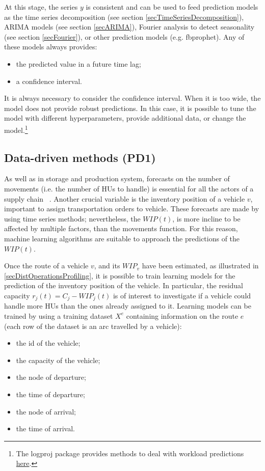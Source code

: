 At this stage, the series $y$ is consistent and can be used to feed prediction models as the time series decomposition (see section \ref{secTimeSeriesDecomposition}), ARIMA models (see section \ref{secARIMA}), Fourier analysis to detect seasonality (see section \ref{secFourier}), or other prediction models (e.g. fbprophet). Any of these models always provides:
\begin{itemize}
    \item the predicted value in a future time lag;
    \item a confidence interval.

\end{itemize}

It is always necessary to consider the confidence interval. When it is too wide, the model does not provide robust predictions. In this case, it is possible to tune the model with different hyperparameters, provide additional data, or change the model.\footnote{The logproj package provides methods to deal with workload predictions \href{https://github.com/aletuf93/logproj/blob/master/examples/LOG_02\%20Demand\%20prediction.ipynb}{here}.}


\subsection{Data-driven methods (PD1)}

As well as in storage and production system, forecasts on the number of movements (i.e. the number of HUs to handle) is essential for all the actors of a supply chain ~\cite{Moon2019}. Another crucial variable is the inventory position of a vehicle $v$, important to assign transportation orders to vehicle. These forecasts are made by using time series methods; nevertheless, the $WIP(t)$, is more incline to be affected by multiple factors, than the movements function. For this reason, machine learning algorithms are suitable to approach the predictions of the $WIP(t)$.\par

Once the route of a vehicle $v$, and its $WIP_v$ have been estimated, as illustrated in \ref{secDistOperationsProfiling}, it is possible to train learning models for the prediction of the inventory position of the vehicle. In particular, the residual capacity $r_j\left(t\right)=C_j-WIP_j(t)$ is of interest to investigate if a vehicle could handle more HUs than the ones already assigned to it. Learning models can be trained by using a training dataset $X^e$ containing information on the route $e$ (each row of the dataset is an arc travelled by a vehicle):
\begin{itemize}
    \item the id of the vehicle;
    \item the capacity of the vehicle;
    \item the node of departure;
    \item the time of departure;
    \item the node of arrival;
    \item the time of arrival.

\end{itemize}

